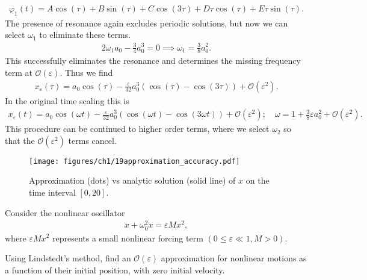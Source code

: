 \begin{ex}
\begin{align}
	\varphi_1(t) = A \cos(\tau) + B \sin(\tau) + C \cos(3\tau) + D\tau \cos(\tau) + E \tau \sin(\tau).
\end{align}
The presence of resonance again excludes periodic solutions, but now we can select $\omega_1$ to eliminate these terms.
\begin{align}
	2\omega_1 a_0 - \frac{3}{4} a_0 ^{3} = 0 \implies \boxed{\omega_1 = \frac{3}{8}a_0^{2}.}
\end{align}
This successfully eliminates the resonance and determines the missing frequency term at $\mathcal{O}(\varepsilon)$. Thus we find
\begin{align}
	x_\varepsilon(\tau) = a_0 \cos(\tau) - \frac{\varepsilon}{32}a_0^{3}\left( \cos(\tau) - \cos (3\tau) \right) + \mathcal{O}(\varepsilon^2).
\end{align}
In the original time scaling this is
\begin{align}
	x_\varepsilon (t) = a_0 \cos (\omega t) - \frac{\varepsilon}{32} a_0^3 \left( \cos(\omega t) - \cos(3\omega t)\right) + \mathcal{O}(\varepsilon^2); \quad \omega = 1+ \frac{3}{8}\varepsilon a_0^2 + \mathcal{O}(\varepsilon^2).	
\end{align}
This procedure can be continued to higher order terms, where we select $\omega_2$ so that the $\mathcal{O}(\varepsilon^2)$ terms cancel.
\begin{figure}[h!]
	\centering
	\texttt{[image: figures/ch1/19approximation\_accuracy.pdf]}
	\caption{Approximation (dots) vs analytic solution (solid line) of $x$ on the time interval $[0,20]$.}
\end{figure}

\end{ex}


\begin{exercise}
Consider the nonlinear oscillator
\begin{align}
	\ddot{x} + \omega_0^2x = \varepsilon Mx^2,
\end{align}
where $\varepsilon M x^2$ represents a small nonlinear forcing term $(0 \leq \varepsilon \ll 1, M > 0)$.

Using Lindstedt's method, find an $\mathcal{O}(\varepsilon)$ approximation for nonlinear motions as a function of their initial position, with zero initial velocity.
\end{exercise}

